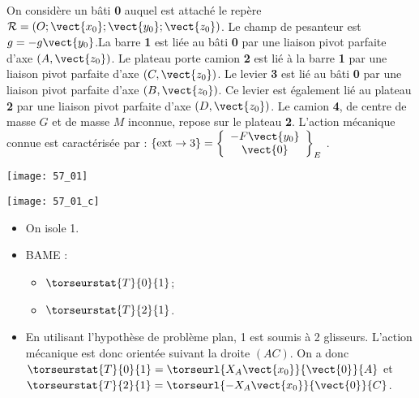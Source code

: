 \normalfalse \difficiletrue \tdifficilefalse
\correctiontrue


\setcounter{question}{0}
\ifcorrection
\else
{}
\fi

\ifprof
\else
On considère un bâti \textbf{0} auquel est attaché le repère$\mathcal{R}=\left(O;\vect{x_0};\vect{y_0};\vect{z_0} \right)$. Le champ de pesanteur est $g=-g\vect{y_0}$.La barre \textbf{1} est liée au bâti \textbf{0} par une liaison pivot parfaite d’axe $\left(A,\vect{z_0}\right)$. Le plateau porte camion \textbf{2} est lié à la barre \textbf{1} par une liaison pivot parfaite d’axe $\left(C,\vect{z_0}\right)$. Le levier \textbf{3} est lié au bâti \textbf{0} par une liaison pivot parfaite d’axe $\left(B,\vect{z_0}\right)$. Ce levier est également lié au plateau \textbf{2} par une liaison pivot parfaite d’axe $\left(D,\vect{z_0}\right)$. Le camion \textbf{4}, de centre de masse $G$ et de masse $M$ inconnue, repose sur le plateau \textbf{2}.
L’action mécanique connue est caractérisée par : $\{\text{ext}\rightarrow 3\}=\left\{
\begin{array}{c}
-F\vect{y_0} \\
\vect{0} \\
\end{array}
\right\}_E$ .


\begin{center}
\texttt{[image: 57\_01]}
\end{center}


\fi

\ifprof
\begin{center}
\texttt{[image: 57\_01\_c]}
\end{center}
\else
\fi



\ifprof
\begin{itemize}
\item On isole 1.
\item BAME :
\begin{itemize}
\item $\torseurstat{T}{0}{1}$;
\item $\torseurstat{T}{2}{1}$.
\end{itemize}
\item En utilisant l'hypothèse de problème plan, 1 est soumis à 2 glisseurs. L'action mécanique est donc orientée suivant la droite $(AC)$. 
On a donc 
$\torseurstat{T}{0}{1} = \torseurl{X_A\vect{x_0}}{\vect{0}}{A}$ et 
$\torseurstat{T}{2}{1} = \torseurl{-X_A\vect{x_0}}{\vect{0}}{C}$.

\end{itemize}
\else
\fi


